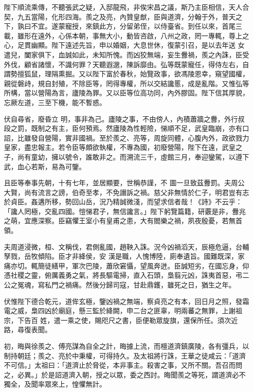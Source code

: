 \begin{pinyinscope}
 陛下順流乘傳，不聽張武之疑，入邸龍飛，非俟宋昌之議，斯乃主臣相信，天人合契，九五當陽，化形四海。羨之及亮，內贊皇猷，臣與道濟，分翰于外，普天之下，孰曰不宜。遂蒙寵授，來鎮此方，分留弟侄，以侍臺省。到任以來，首尾三載，雖形在遠外，心係本朝，事無大小，動皆咨啟，八州之政，罔一專輒，尊上之心，足貫幽顯。陛下遠述先旨，申以婚姻，大息世休，復蒙引召，是以去年送
 女遣兒，闔家俱下，血誠如此，未知所愧。而凶狡無端，妄生釁禍，羨之內誅，臣受外伐，顧省諸懷，不識何罪？天聽遐邈，陳訴靡由。弘等既蒙寵任，得侍左右，自謂勢擅狐鼠，理隔熏掘。又以陛下富於春秋，始覽政事，欲馮陵恩幸，窺望國權，親從磐歭，規自封殖，不除臣等，罔得專權，所以交結讒慝，成是亂階。又惟弘等所構，當以營陽為言，廬陵為罪。又以臣等位高功同，內外膠固。陛下信其厚貌，忘厥左道，三至下機，能不暫惑。



 伏自尋省，廢昏立
 明，事非為己。廬陵之事，不由傍人，內積蕭牆之釁，外行叔段之罰，既制之有主，臣何預焉。然廬陵為性輕險，悌順不足，武皇臨崩，亦有口詔，比雖發自營陽，實非國禍。至於羨之、亮等，周旋同體，心腹內外，政欲戮力皇家，盡忠報主。若令臣等頗欲執權，不專為國，初廢營陽，陛下在遠，武皇之子，尚有童幼，擁以號令，誰敢非之。而溯流三千，虛館三月，奉迎鑾駕，以遵下武，血心若斯，易為可鑒。



 且臣等奉事先朝，十有七年，並居顯要，世稱恭謹，不
 圖一旦致茲釁罰。夫周公大賢，尚有流言之謗，伯奇至孝，不免譖訴之禍。慈父非無情於仁子，明君豈有志於貞臣。姦遘所移，勢回山岳，況乃精誠微淺，而望求信者哉！《詩》不云乎：「讒人罔極，交亂四國。愷悌君子，無信讒言。」陛下躬覽篇籍，研覈是非，釁兆之萌，宜應深察。臣竊懼王室小有皇甫之患，大有閻樂之禍，夙夜殷憂，若無首領。



 夫周道浸微，桓、文稱伐，君側亂國，趙鞅入誅。況今凶禍滔天，辰極危逼，台輔孥戮，岳牧傾陷。臣才非絳侯，安
 漢是職，人愧博陸，廁奉遺旨。國難既深，家痛亦切。輒簡徒繕甲，軍次巴陵，蕭欣窘懾，望風奔迸。臣誠短劣，在國忘身，仰憑社稷之靈，俯厲義勇之氣，將長驅電掃，直入石頭，梟翦元凶，誅夷首惡，弔二公之冤魂，寫私門之禍痛。然後分歸司寇，甘赴鼎鑊，雖死之日，猶生之年。



 伏惟陛下德合乾元，道侔玄極，鑒凶禍之無端，察貞亮之有本，回日月之照，發霜電之威，梟四凶於廟庭，懸三監於絳闕，申二台之匪辜，明兩蕃之無罪，上謝祖宗，下告百
 姓，遣一乘之使，賜咫尺之書，臣便勒眾旋旗，還保所任。須次近路，尋復表聞。



 初，晦與徐羨之、傅亮謀為自全之計，晦據上流，而檀道濟鎮廣陵，各有彊兵，以制持朝廷；羨之、亮於中秉權，可得持久。及太祖將行誅，王華之徒咸云：「道濟不可信。」太祖曰：「道濟止於脅從，本非事主。殺害之事，又所不關。吾召而問之，必異。」於是詔道濟入朝，授之以眾，委之西討。晦聞羨之等死，謂道濟必不獨全，及聞率眾來上，惶懼無計。




\end{pinyinscope}
